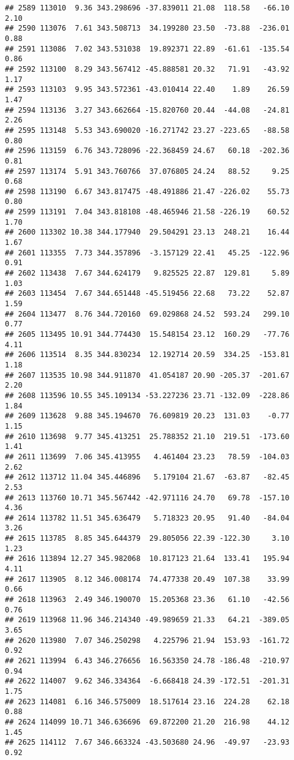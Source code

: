\documentclass[]{article}
\begin{document}
\begin{verbatim}
## 2589 113010  9.36 343.298696 -37.839011 21.08  118.58   -66.10  2.10
## 2590 113076  7.61 343.508713  34.199280 23.50  -73.88  -236.01  0.88
## 2591 113086  7.02 343.531038  19.892371 22.89  -61.61  -135.54  0.86
## 2592 113100  8.29 343.567412 -45.888581 20.32   71.91   -43.92  1.17
## 2593 113103  9.95 343.572361 -43.010414 22.40    1.89    26.59  1.47
## 2594 113136  3.27 343.662664 -15.820760 20.44  -44.08   -24.81  2.26
## 2595 113148  5.53 343.690020 -16.271742 23.27 -223.65   -88.58  0.80
## 2596 113159  6.76 343.728096 -22.368459 24.67   60.18  -202.36  0.81
## 2597 113174  5.91 343.760766  37.076805 24.24   88.52     9.25  0.68
## 2598 113190  6.67 343.817475 -48.491886 21.47 -226.02    55.73  0.80
## 2599 113191  7.04 343.818108 -48.465946 21.58 -226.19    60.52  1.70
## 2600 113302 10.38 344.177940  29.504291 23.13  248.21    16.44  1.67
## 2601 113355  7.73 344.357896  -3.157129 22.41   45.25  -122.96  0.91
## 2602 113438  7.67 344.624179   9.825525 22.87  129.81     5.89  1.03
## 2603 113454  7.67 344.651448 -45.519456 22.68   73.22    52.87  1.59
## 2604 113477  8.76 344.720160  69.029868 24.52  593.24   299.10  0.77
## 2605 113495 10.91 344.774430  15.548154 23.12  160.29   -77.76  4.11
## 2606 113514  8.35 344.830234  12.192714 20.59  334.25  -153.81  1.18
## 2607 113535 10.98 344.911870  41.054187 20.90 -205.37  -201.67  2.20
## 2608 113596 10.55 345.109134 -53.227236 23.71 -132.09  -228.86  1.84
## 2609 113628  9.88 345.194670  76.609819 20.23  131.03    -0.77  1.15
## 2610 113698  9.77 345.413251  25.788352 21.10  219.51  -173.60  1.41
## 2611 113699  7.06 345.413955   4.461404 23.23   78.59  -104.03  2.62
## 2612 113712 11.04 345.446896   5.179104 21.67  -63.87   -82.45  2.53
## 2613 113760 10.71 345.567442 -42.971116 24.70   69.78  -157.10  4.36
## 2614 113782 11.51 345.636479   5.718323 20.95   91.40   -84.04  3.26
## 2615 113785  8.85 345.644379  29.805056 22.39 -122.30     3.10  1.23
## 2616 113894 12.27 345.982068  10.817123 21.64  133.41   195.94  4.11
## 2617 113905  8.12 346.008174  74.477338 20.49  107.38    33.99  0.66
## 2618 113963  2.49 346.190070  15.205368 23.36   61.10   -42.56  0.76
## 2619 113968 11.96 346.214340 -49.989659 21.33   64.21  -389.05  3.65
## 2620 113980  7.07 346.250298   4.225796 21.94  153.93  -161.72  0.92
## 2621 113994  6.43 346.276656  16.563350 24.78 -186.48  -210.97  0.94
## 2622 114007  9.62 346.334364  -6.668418 24.39 -172.51  -201.31  1.75
## 2623 114081  6.16 346.575009  18.517614 23.16  224.28    62.18  0.88
## 2624 114099 10.71 346.636696  69.872200 21.20  216.98    44.12  1.45
## 2625 114112  7.67 346.663324 -43.503680 24.96  -49.97   -23.93  0.92

\end{verbatim}
\end{document}
